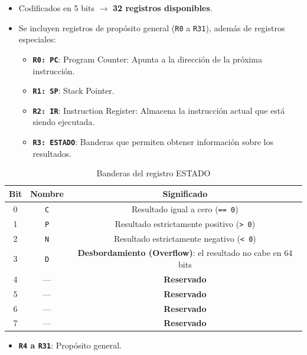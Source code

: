 \documentclass{article}
\begin{document}
\begin{itemize}
    \item Codificados en 5 bits $\rightarrow$ \textbf{32 registros disponibles}.
    \item Se incluyen registros de propósito general (\texttt{R0} a \texttt{R31}), además de registros especiales:
    \begin{itemize}
        \item \textbf{\texttt{R0: PC}}: Program Counter: Apunta a la dirección de la próxima instrucción.
        \item \textbf{\texttt{R1: SP}}: Stack Pointer.
        \item \textbf{\texttt{R2: IR}}: Instruction Register: Almacena la instrucción actual que está siendo ejecutada.
        \item \textbf{\texttt{R3: ESTADO}}: Banderas que permiten obtener información sobre los resultados.
    \end{itemize}
\end{itemize}

\begin{table}[H]
    \centering
    \begin{tabular}{|c|c|c|}
    \hline
    \textbf{Bit} & \textbf{Nombre} & \textbf{Significado} \\
    \hline
    0 & \texttt{C} & Resultado igual a cero (\texttt{== 0}) \\
    1 & \texttt{P} & Resultado estrictamente positivo (\texttt{> 0}) \\
    2 & \texttt{N} & Resultado estrictamente negativo (\texttt{< 0}) \\
    3 & \texttt{D} & \textbf{Desbordamiento (Overflow)}: el resultado no cabe en 64 bits \\
    4 & — & \textbf{Reservado} \\
    5 & — & \textbf{Reservado} \\
    6 & — & \textbf{Reservado} \\
    7 & — & \textbf{Reservado} \\
    \hline
    \end{tabular}
    \caption{Banderas del registro ESTADO}
\end{table}

\begin{itemize}
    \item \textbf{\texttt{R4} a \texttt{R31}}: Propósito general.
\end{itemize}
\end{document}
